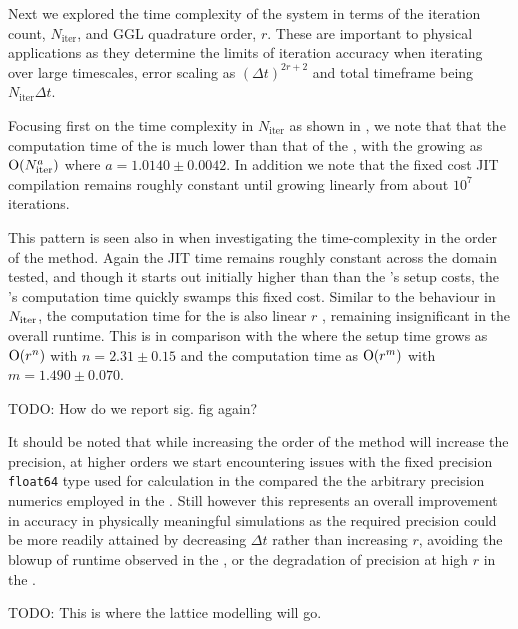 Next we explored the time complexity of the system in terms of the iteration count, $N_{\text{iter}}$, and GGL quadrature order, $r$. These are important to physical applications as they determine the limits of iteration accuracy when iterating over large timescales, error scaling as $(\Delta t)^{2r + 2}$ and total timeframe being $N_{\text{iter}} \Delta t$.

Focusing first on the time complexity in $N_{\text{iter}}$ as shown in , we note that that the computation time of the \updimpl{} is much lower than that of the \orgimpl{}, with the \updimpl{} growing as $\mathord{\mathrm{O}}(N_{\mathrm{iter}}^a)$ where $a = 1.0140 \pm 0.0042$. In addition we note that the fixed cost JIT compilation remains roughly constant until growing linearly from about $10^7$ iterations.

This pattern is seen also in  when investigating the time-complexity in the order of the method. Again the JIT time remains roughly constant across the domain tested, and though it starts out initially higher than than the \orgimpl{}'s setup costs, the \orgimpl{}'s computation time quickly swamps this fixed cost.
Similar to the behaviour in $N_{\mathrm{iter}}$, the computation time for the \updimpl{} is also linear $r$ , remaining insignificant in the overall runtime. This is in comparison with the \orgimpl{} where the setup time grows as $\mathord{\mathrm{O}}(r^n)$ with $n = {2.31 \pm 0.15}$ and the computation time as $\mathord{\mathrm{O}}(r^m)$ with $m={1.490 \pm 0.070}$.

TODO: How do we report sig. fig again?

It should be noted that while increasing the order of the method will increase the precision, at higher orders we start encountering issues with the fixed precision \texttt{float64} type used for calculation in the \updimpl{} compared the the arbitrary precision numerics employed in the \orgimpl{}.
Still however this represents an overall improvement in accuracy in physically meaningful simulations as the required precision could be more readily attained by decreasing $\Delta t$ rather than increasing $r$, avoiding the blowup of runtime observed in the \orgimpl{}, or the degradation of precision at high $r$ in the \updimpl{}. 

TODO: This is where the lattice modelling will go.


